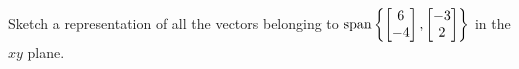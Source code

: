 \begin{applicationActivities}
\begin{activity}{5}
    Sketch a representation of all the vectors belonging to
    \(\operatorname{span}\left\{\begin{bmatrix}6\\-4\end{bmatrix},
     \begin{bmatrix}-3\\2\end{bmatrix}\right\}\)
    in the \(xy\) plane.
\end{activity}


\end{applicationActivities}
